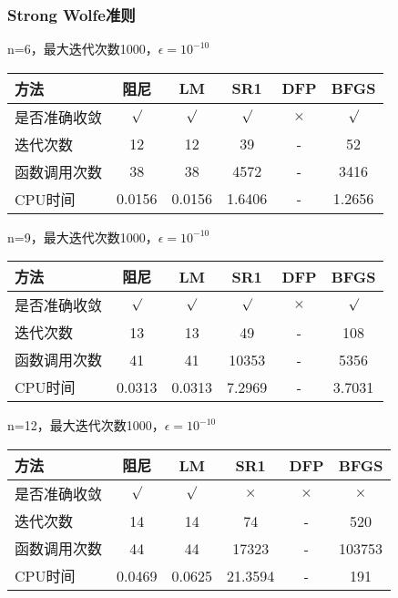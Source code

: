 \documentclass[11pt, a4paper]{article}
\begin{document}
\subsubsection{Strong Wolfe准则}

n=6，最大迭代次数1000，$\epsilon=10^{-10}$

\vspace{10pt}
\begin{tabular}{|l|c|c|c|c|c|}
	\hline
	方法 & 阻尼 & LM & SR1 & DFP & BFGS \\\hline
	是否准确收敛 & $\surd$ & $\surd$ & $\surd$ & $\times$ & $\surd$ \\\hline
	迭代次数 & 12 & 12 & 39 & - & 52 \\\hline
	函数调用次数 & 38 & 38 & 4572 & - & 3416 \\\hline
	CPU时间 & 0.0156 & 0.0156 & 1.6406 & - & 1.2656\\\hline
\end{tabular}

\vspace{20pt}
n=9，最大迭代次数1000，$\epsilon=10^{-10}$

\vspace{10pt}
\begin{tabular}{|l|c|c|c|c|c|}
	\hline
	方法 & 阻尼 & LM & SR1 & DFP & BFGS \\\hline
	是否准确收敛 & $\surd$ & $\surd$ & $\surd$ & $\times$ & $\surd$ \\\hline
	迭代次数 & 13 & 13 & 49 & - & 108 \\\hline
	函数调用次数 & 41 & 41 & 10353 & - & 5356 \\\hline
	CPU时间 & 0.0313 & 0.0313 & 7.2969 & - & 3.7031\\\hline
\end{tabular}

\vspace{20pt}
n=12，最大迭代次数1000，$\epsilon=10^{-10}$

\vspace{10pt}
\begin{tabular}{|l|c|c|c|c|c|}
	\hline
	方法 & 阻尼 & LM & SR1 & DFP & BFGS \\\hline
	是否准确收敛 & $\surd$ & $\surd$ & $\times$ & $\times$ & $\times$ \\\hline
	迭代次数 & 14 & 14 & 74 & - & 520 \\\hline
	函数调用次数 & 44 & 44 & 17323 & - & 103753 \\\hline
	CPU时间 & 0.0469 & 0.0625 & 21.3594 & - & 191\\\hline
\end{tabular}
\end{document}
